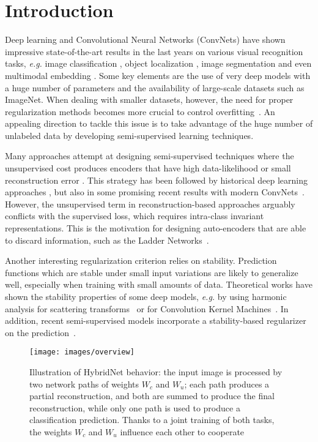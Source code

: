 \documentclass[runningheads]{llncs}
\begin{document}
\section{Introduction}

Deep learning and Convolutional Neural Networks (ConvNets) have shown impressive state-of-the-art results in the last years on various visual recognition tasks, \textit{e.g.} image classification \cite{krizhevsky2012imagenet,he2016deep,Durand_WILDCAT_CVPR_2017}, object localization \cite{dai2016r,redmon2016you,Mordan2017}, image segmentation \cite{deeplab} and even multimodal embedding \cite{Martin2018,Carvalho2018,benyounescadene2017mutan}. Some key elements are the use of very deep models with a huge number of parameters and the availability of large-scale datasets such as ImageNet. When dealing with smaller datasets, however, the need for proper regularization methods becomes more crucial to control overfitting~\cite{weightdecay,batchnorm,dropout,Blot2018}. An appealing direction to tackle this issue is to take advantage of the huge number of unlabeled data by developing semi-supervised learning techniques.

Many approaches attempt at designing semi-supervised techniques where the unsupervised cost produces encoders that have high data-likelihood or small reconstruction error \cite{bengio2007greedy}. This strategy has been followed by historical deep learning approaches \cite{hinton2006reducing}, but also in some promising recent results with modern Conv\-Nets~\cite{Zhao2016a,Zhang2016a}. However, the unsupervised term in reconstruction-based approaches arguably conflicts with the supervised loss, which requires intra-class invariant representations. This is the motivation for designing auto-encoders that are able to discard information, such as the Ladder Networks~\cite{Rasmus2015}.

Another interesting regularization criterion relies on stability. Prediction functions which are stable under small input variations are likely to generalize well, especially when training with small amounts of data. Theoretical works have shown the stability properties of some deep models, \textit{e.g.} by using harmonic analysis for scattering transforms~\cite{Mallat2011,Bruna:2013:ISC:2498740.2498892} or for Convolution Kernel Machines~\cite{BiettiNIPS17}. In addition, recent semi-supervised models incorporate a stability-based regularizer on the prediction~\cite{Sajjadi2016,Laine2016,Tarvainen2017}.

\begin{figure}[tb]
	\centering
	\texttt{[image: images/overview]}
    \caption{Illustration of HybridNet behavior: the input image is processed by two network paths of weights $W_c$ and $W_u$; each path produces a partial reconstruction, and both are summed to produce the final reconstruction, while only one path is used to produce a classification prediction. Thanks to a joint training of both tasks, the weights $W_c$ and $W_u$ influence each other to cooperate}
    \label{fig:intro}
\end{figure}
\end{document}
